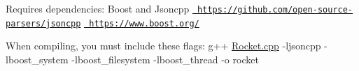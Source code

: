 Requires dependencies\+: Boost and Jsoncpp \href{https://github.com/open-source-parsers/jsoncpp}{\texttt{ https\+://github.\+com/open-\/source-\/parsers/jsoncpp}} \href{https://www.boost.org/}{\texttt{ https\+://www.\+boost.\+org/}}

When compiling, you must include these flags\+: g++ \mbox{\hyperlink{_rocket_8cpp}{Rocket.\+cpp}} -\/ljsoncpp -\/lboost\+\_\+system -\/lboost\+\_\+filesystem -\/lboost\+\_\+thread -\/o rocket 
